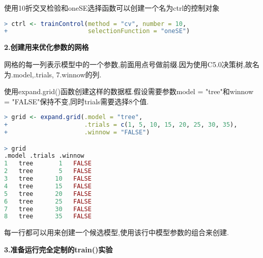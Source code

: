 \documentclass[11pt,a4paper,oneside]{book}
\begin{document}
使用10折交叉检验和oneSE选择函数可以创建一个名为ctrl的控制对象
\begin{lstlisting}[language=r]
> ctrl <- trainControl(method = "cv", number = 10,
+                      selectionFunction = "oneSE")
\end{lstlisting}

\textbf{2.创建用来优化参数的网格}

网格的每一列表示模型中的一个参数,前面用点号做前缀.因为使用C5.0决策树,故名为.model,.trials,
7.winnow的列.

使用expand.grid()函数创建这样的数据框.假设需要参数model = "tree"和winnow = "FALSE"保持不变,同时trials需要选择8个值.
\begin{lstlisting}[language=r]
> grid <- expand.grid(.model = "tree",
+                     .trials = c(1, 5, 10, 15, 20, 25, 30, 35),
+                     .winnow = "FALSE")

> grid
.model .trials .winnow
1   tree       1   FALSE
2   tree       5   FALSE
3   tree      10   FALSE
4   tree      15   FALSE
5   tree      20   FALSE
6   tree      25   FALSE
7   tree      30   FALSE
8   tree      35   FALSE
\end{lstlisting}
每一行都可以用来创建一个候选模型,使用该行中模型参数的组合来创建.

\textbf{3.准备运行完全定制的train()实验}
\end{document}

